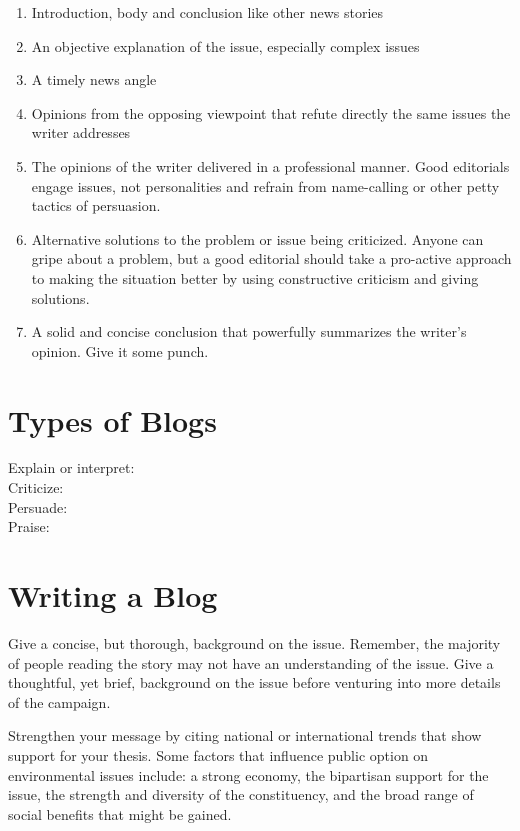 \documentclass{tufte-handout}\usepackage[]{graphicx}\usepackage[]{color}
\begin{document}
\begin{enumerate}
	\item Introduction, body and conclusion like other news stories
	\item An objective explanation of the issue, especially complex issues
	\item A timely news angle
	\item Opinions from the opposing viewpoint that refute directly the same issues the writer addresses
	\item The opinions of the writer delivered in a professional manner. Good editorials engage issues, not personalities and refrain from name-calling or other petty tactics of persuasion.
	\item Alternative solutions to the problem or issue being criticized. Anyone can gripe about a problem, but a good editorial should take a pro-active approach to making the situation better by using constructive criticism and giving solutions.
	\item A solid and concise conclusion that powerfully summarizes the writer's opinion. Give it some punch.
\end{enumerate}


\section{Types of Blogs}

\begin{description}
	\item[Explain or interpret:] 
	\item[Criticize:] 
	
	\item[Persuade:] 
	
	\item[Praise:] 
	
\end{description}
 



\section{Writing a Blog}

Give a concise, but thorough, background on the issue. Remember, the majority of people reading the story may not have an understanding of the issue. Give a thoughtful, yet brief, background on the issue before venturing into more details of the campaign.

Strengthen your message by citing national or international trends that show support for your thesis. Some factors  that influence public option on environmental issues include: a strong economy, the bipartisan support for the issue, the strength and diversity of the constituency, and the broad range of social benefits that might be gained.
\end{document}
